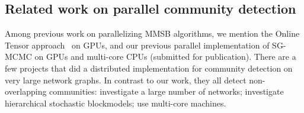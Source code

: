 \begin{comment}
Then we obtain the normalization term by $Z_{ab}^{(y)} = \sm{k}{K}f_{ab}^{(y)}(k)$. 
Integrating out the expectation in Eqn. \eqref{eqn:grad_local}, we obtain 
\bea
g_{ab}(\phi_{ak}) = \f{f_{ab}^{(y)}(k)}{Z_{ab}^{(y)}\phi_{ak}} - \f{1}{\phi_a}.
\eea 
Plugging this to Eqn. \ref{eqn:sgrld_update}, we obtain the SGRLD update rule for the local parameter $\phi_{ak}$
\bea
\phi_{ak}^* \law \left| \phi_{ak} + \f{\ep}{2} \left( \al - \phi_{ak} + \f{N}{|\Neighbors|} \sum_{b \in \Neighbors} g_{ab}(\phi_{ak})\right) \right. \nn \\ \left. + (\phi_{ak})^{\ha} \xi_{ak}\right|.\label{eqn:local_update}
\eea
Here, the $\Neighbors$ is the neighbor set for a mini-batch node, another random mini-batch of $n$ nodes sampled from $\cV^*$. Note that $|\Neighbors| \ll |\cV^*|=N$.

\end{comment}

\subsection{Related work on parallel community detection}

Among previous work on parallelizing MMSB algorithms, we mention the Online
Tensor approach~\cite{DBLP:journals/corr/HuangNHVA13} on GPUs, and our previous
parallel implementation of SG-MCMC on GPUs and multi-core CPUs (submitted for
publication). There are a few projects that did a distributed implementation
for community detection on very large network graphs. In contrast to our work,
they all detect non-overlapping communities: \cite{Bu2013246} investigate a
large number of networks; \cite{2015arXiv150302115L} investigate hierarchical
stochastic blockmodels; \cite{Prat-Perez:2014:HQS:2566486.2568010} use
multi-core machines.

\begin{comment}
In this paper, we describe our custom RDMA D-KV (Distributed Key-Value)
store. Current RMDA D-KV store implementations are RamCloud~\cite{RamCloud},
Pilaf~\cite{Pilaf}, Herd~\cite{Herd} and FaRM~\cite{FaRM}. All these systems
use RDMA to implement a D-KV store. However, all of them are far more powerful
than our custom implementation -- and this power comes at a cost that we
can avoid. They implement a generic D-KV store that controls concurrency,
supports dynamic inserts and deletes, supports variable-sized values
(whose size may change at an update), and keys of arbitrary type. Because
of the nature of our distributed algorithm, we have to deal with none of
these issues. For us, values are fixed-size, allocated only at the initial
population, and remain alive forever. We have no concurrency between writes
and reads or other writes. Our keys are a contiguous range of integers. All
these properties together allow an extremely low-overhead implementation
that does not involve the remote host in any transaction.
\end{comment}
